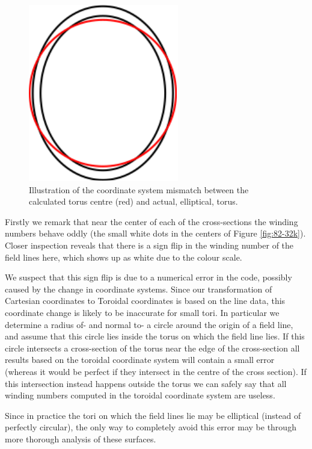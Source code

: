 \documentclass[a4paper]{article}
\begin{document}
\begin{figure}[!hb]
	\centering
	\includegraphics{Figures/TorusMismatch.pdf}
	\caption{ Illustration of the coordinate system mismatch between the calculated torus centre (red) and actual, elliptical, torus.}\label{fig:mismatch}
\end{figure}
Firstly we remark that near the center of each of the cross-sections the winding numbers behave oddly (the small white dots in the centers of Figure \ref{fig:82-32k}).
Closer inspection reveals that there is a sign flip in the winding number of the field lines here, which shows up as white due to the colour scale. 

We suspect that this sign flip is due to a numerical error in the code, possibly caused by the change in coordinate systems. 
Since our transformation of Cartesian coordinates to Toroidal coordinates is based on the line data, this coordinate change is likely to be inaccurate for small tori. 
In particular we determine a radius of- and normal to- a circle around the origin of a field line, and assume that this circle lies inside the torus on which the field line lies. If this circle intersects a cross-section of the torus near the edge of the cross-section all results based on the toroidal coordinate system will contain a small error (whereas it would be perfect if they intersect in the centre of the cross section). 
If this intersection instead happens outside the torus we can safely say that all winding numbers computed in the toroidal coordinate system are useless. 

Since in practice the tori on which the field lines lie may be elliptical (instead of perfectly circular), the only way to completely avoid this error may be through more thorough analysis of these surfaces.\\
\end{document}
